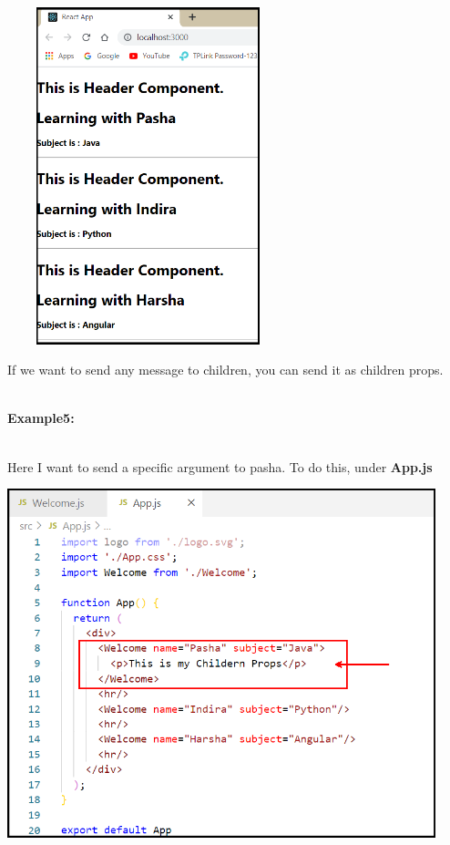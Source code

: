 \documentclass{article}
\begin{document}
\begin{center}
	\noindent \includegraphics*[width=3.22in, height=3.85in]{IMG-08-17}
\end{center}

\noindent 

\noindent 
If we want to send any message to children, you can send it as children props.

\noindent 

\noindent \\
\textbf{Example5:}

\noindent \\
Here I want to send a specific argument to pasha. To do this, under \textbf{App.js}

\begin{center}
	\noindent \includegraphics*[width=4.90in, height=3.99in]{IMG-08-18}
\end{center}
\end{document}
